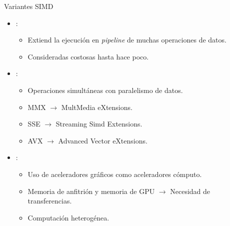 \begin{frame}[t]{Variantes SIMD}
\begin{itemize}
  \item {}:
    \begin{itemize}
      \item Extiend la ejecución en \emph{pipeline} de muchas operaciones de datos.
      \item Consideradas costosas hasta hace poco.
    \end{itemize}

  \item {}:
    \begin{itemize}
      \item Operaciones simultáneas con paralelismo de datos.
      \item MMX $\rightarrow$ MultMedia eXtensions.
      \item SSE $\rightarrow$ Streaming Simd Extensions.
      \item AVX $\rightarrow$ Advanced Vector eXtensions.
    \end{itemize}

  \item {}:
    \begin{itemize}
      \item Uso de aceleradores gráficos como aceleradores cómputo.
      \item Memoria de anfitrión y memoria de GPU $\rightarrow$ Necesidad de transferencias.
      \item Computación heterogénea.
    \end{itemize}

\end{itemize}
\end{frame}
